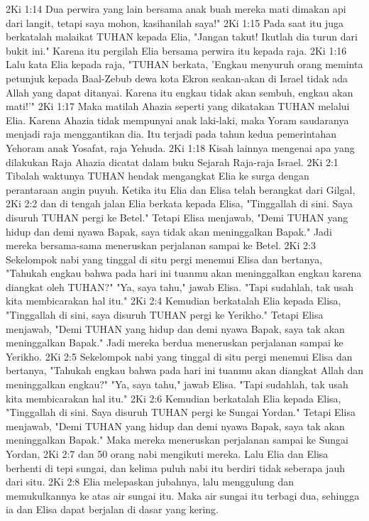 2Ki 1:14  Dua perwira yang lain bersama anak buah mereka mati dimakan api dari langit, tetapi saya mohon, kasihanilah saya!"
2Ki 1:15  Pada saat itu juga berkatalah malaikat TUHAN kepada Elia, "Jangan takut! Ikutlah dia turun dari bukit ini." Karena itu pergilah Elia bersama perwira itu kepada raja.
2Ki 1:16  Lalu kata Elia kepada raja, "TUHAN berkata, 'Engkau menyuruh orang meminta petunjuk kepada Baal-Zebub dewa kota Ekron seakan-akan di Israel tidak ada Allah yang dapat ditanyai. Karena itu engkau tidak akan sembuh, engkau akan mati!'"
2Ki 1:17  Maka matilah Ahazia seperti yang dikatakan TUHAN melalui Elia. Karena Ahazia tidak mempunyai anak laki-laki, maka Yoram saudaranya menjadi raja menggantikan dia. Itu terjadi pada tahun kedua pemerintahan Yehoram anak Yosafat, raja Yehuda.
2Ki 1:18  Kisah lainnya mengenai apa yang dilakukan Raja Ahazia dicatat dalam buku Sejarah Raja-raja Israel.
2Ki 2:1  Tibalah waktunya TUHAN hendak mengangkat Elia ke surga dengan perantaraan angin puyuh. Ketika itu Elia dan Elisa telah berangkat dari Gilgal,
2Ki 2:2  dan di tengah jalan Elia berkata kepada Elisa, "Tinggallah di sini. Saya disuruh TUHAN pergi ke Betel." Tetapi Elisa menjawab, "Demi TUHAN yang hidup dan demi nyawa Bapak, saya tidak akan meninggalkan Bapak." Jadi mereka bersama-sama meneruskan perjalanan sampai ke Betel.
2Ki 2:3  Sekelompok nabi yang tinggal di situ pergi menemui Elisa dan bertanya, "Tahukah engkau bahwa pada hari ini tuanmu akan meninggalkan engkau karena diangkat oleh TUHAN?" "Ya, saya tahu," jawab Elisa. "Tapi sudahlah, tak usah kita membicarakan hal itu."
2Ki 2:4  Kemudian berkatalah Elia kepada Elisa, "Tinggallah di sini, saya disuruh TUHAN pergi ke Yerikho." Tetapi Elisa menjawab, "Demi TUHAN yang hidup dan demi nyawa Bapak, saya tak akan meninggalkan Bapak." Jadi mereka berdua meneruskan perjalanan sampai ke Yerikho.
2Ki 2:5  Sekelompok nabi yang tinggal di situ pergi menemui Elisa dan bertanya, "Tahukah engkau bahwa pada hari ini tuanmu akan diangkat Allah dan meninggalkan engkau?" "Ya, saya tahu," jawab Elisa. "Tapi sudahlah, tak usah kita membicarakan hal itu."
2Ki 2:6  Kemudian berkatalah Elia kepada Elisa, "Tinggallah di sini. Saya disuruh TUHAN pergi ke Sungai Yordan." Tetapi Elisa menjawab, "Demi TUHAN yang hidup dan demi nyawa Bapak, saya tak akan meninggalkan Bapak." Maka mereka meneruskan perjalanan sampai ke Sungai Yordan,
2Ki 2:7  dan 50 orang nabi mengikuti mereka. Lalu Elia dan Elisa berhenti di tepi sungai, dan kelima puluh nabi itu berdiri tidak seberapa jauh dari situ.
2Ki 2:8  Elia melepaskan jubahnya, lalu menggulung dan memukulkannya ke atas air sungai itu. Maka air sungai itu terbagi dua, sehingga ia dan Elisa dapat berjalan di dasar yang kering.
